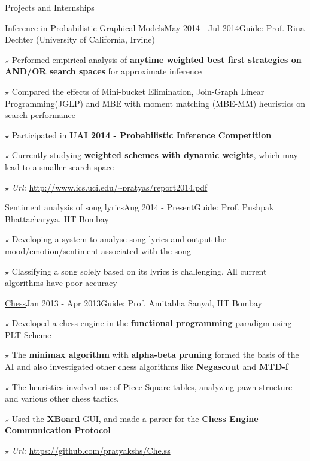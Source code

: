 \documentclass{resume2} %
\begin{document}
\begin{rSection}{Projects and Internships}

\begin{rSubsection}{\href{http://www.ics.uci.edu/~pratyas/report2014.pdf}{Inference in Probabilistic Graphical Models}}{May 2014 - Jul 2014}{Guide: Prof. Rina Dechter (University of California, Irvine)
}{}
\item[$\star$] Performed empirical analysis of \textbf{anytime weighted best first strategies on AND/OR search spaces} for approximate inference 
\item[$\star$] Compared the effects of Mini-bucket Elimination, Join-Graph Linear Programming(JGLP) and MBE with moment matching (MBE-MM) heuristics on search performance
\item[$\star$] Participated in \textbf{UAI 2014 - Probabilistic Inference Competition}
\item[$\star$] Currently studying \textbf{weighted schemes with dynamic weights}, which may lead to a smaller search space
\item[$\star$] \emph{Url:} \url{http://www.ics.uci.edu/~pratyas/report2014.pdf}
\end{rSubsection}

\clearpage

\begin{rSubsection}{Sentiment analysis of song lyrics}{Aug 2014 - Present}{Guide: Prof. Pushpak Bhattacharyya, IIT Bombay}{}
\item[$\star$] Developing a system to analyse song lyrics and output the mood/emotion/sentiment associated with the song
\item[$\star$] Classifying a song solely based on its lyrics is challenging. All current algorithms have poor accuracy
\end{rSubsection}


\begin{rSubsection}{\href{https://github.com/pratyakshs/Che.ss}{Chess}}{Jan 2013 - Apr 2013}{Guide: Prof. Amitabha Sanyal, IIT Bombay}{}
\item[$\star$] Developed a chess engine in the \textbf{functional programming} paradigm using PLT Scheme
\item[$\star$] The \textbf{minimax algorithm} with \textbf{alpha-beta pruning} formed the basis of the AI and also investigated other chess algorithms like \textbf{Negascout} and \textbf{MTD-f} \item[$\star$] The heuristics involved use of Piece-Square tables, analyzing pawn structure and various other chess tactics.
\item[$\star$] Used the \textbf{XBoard} GUI, and made a parser for the \textbf{Chess Engine Communication Protocol}
\item[$\star$] \emph{Url:} \url{https://github.com/pratyakshs/Che.ss}
\end{rSubsection}






\end{rSection}
\end{document}
